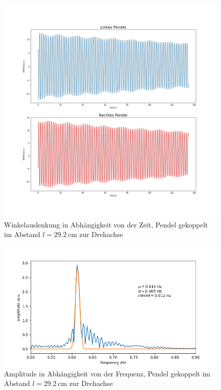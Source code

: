 \begin{figure}[H]
	\centering
	\includegraphics[height = 0.5 \textheight]{figures/211-7.jpeg}
	\caption{Winkelauslenkung in Abhängigkeit von der Zeit, Pendel gekoppelt im Abstand $l = \SI{29,2}{\cm}$ zur Drehachse}
\end{figure}
\begin{figure}[H]
	\centering
	\includegraphics[height = 0.25 \textheight]{figures/211-6.jpeg}
	\caption{Amplitude in Abhängigkeit von der Frequenz, Pendel gekoppelt im Abstand $l = \SI{29,2}{\cm}$ zur Drehachse}
\end{figure}

